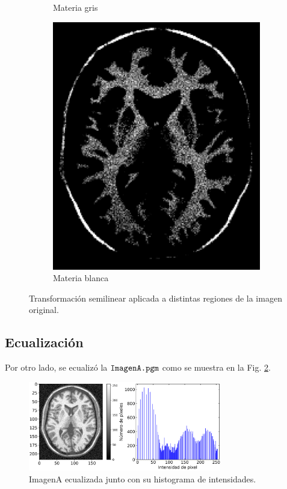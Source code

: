 \documentclass[letterpaper,12pt]{article}
\theoremstyle{plain}
\begin{document}
\begin{figure}[H]
\begin{subfigure}[h]{0.24\linewidth}
            \caption{Materia gris} 
         \end{subfigure}
         \begin{subfigure}[h]{0.24\linewidth}
            \centering
            \includegraphics[width=\textwidth]{Figuras/ImageA_113_150.png}
            \caption{Materia blanca} 
         \end{subfigure}
    \caption{Transformación semilinear aplicada a distintas regiones de la imagen original.%
    }
    \label{fig:Semilineartrans_region}
\end{figure}

\subsection{Ecualización}

Por otro lado, se ecualizó la $\verb|ImagenA.pgm|$ como se muestra en la Fig. \ref{fig:EQ}. 

\begin{figure}[H]
    \centering
        \includegraphics[width=0.75\textwidth]{Figuras/ImageA_EQ_hist.png}
    \caption{ImagenA ecualizada junto con su histograma de intensidades.} 
    \label{fig:EQ}
\end{figure}
\end{document}
